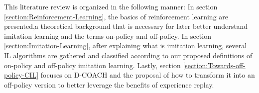 \setlength{\parskip}{1em}

This literature review is organized in the following manner: In section \ref{section:Reinforcement-Learning}, the basics of reinforcement learning are presented,a theoretical background that is necessary for later better understand imitation learning and the terms on-policy and off-policy. In section \ref{section:Imitation-Learning}, after explaining what is imitation learning, several IL algorithms are gathered and classified according to our proposed definitions of on-policy and off-policy imitation learning. Lastly, section \ref{section:Towards-off-policy-CIL} focuses on D-COACH and the proposal of how to transform it into an off-policy version to better leverage the benefits of experience replay.






